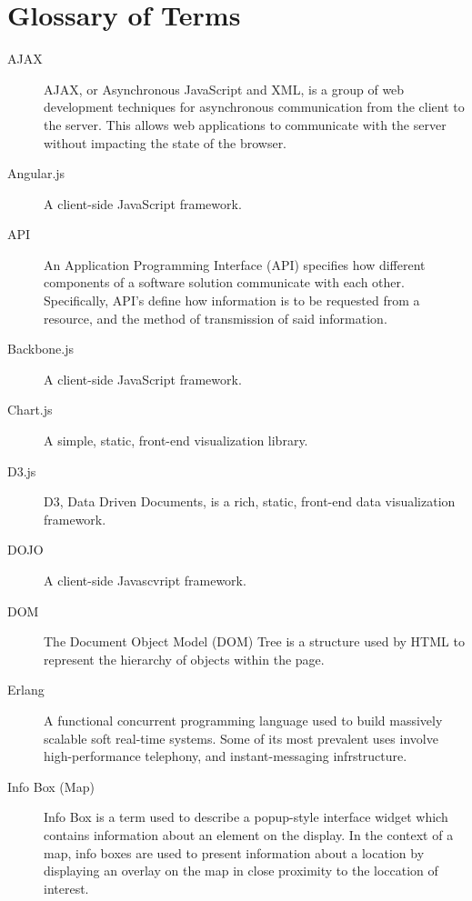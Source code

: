 \documentclass{report}
\begin{document}


\dotableofcontents

\newpage

\chapter*{Glossary of Terms}
\begin{description}
\item[AJAX] AJAX, or Asynchronous JavaScript and XML, is a group of web development techniques for asynchronous communication from the client to the server. This allows web applications to communicate with the server without impacting the state of the browser.
\item[Angular.js] A client-side JavaScript framework.
\item[API] An Application Programming Interface (API) specifies how different components of a software solution communicate with each other. Specifically, API's define how information is to be requested from a resource, and the method of transmission of said information.
\item[Backbone.js] A client-side JavaScript framework.
\item[Chart.js] A simple, static, front-end visualization library.
\item[D3.js] D3, Data Driven Documents, is a rich, static, front-end data visualization framework.
\item[DOJO] A client-side Javascvript framework.
\item[DOM] The Document Object Model (DOM) Tree is a structure used by HTML to represent the hierarchy of objects within the page.
\item[Erlang] A functional concurrent programming language used to build massively scalable soft real-time systems. Some of its most prevalent uses involve high-performance telephony, and instant-messaging infrstructure.
\item[Info Box (Map)] Info Box is a term used to describe a popup-style interface widget which contains information about an element on the display. In the context of a map, info boxes are used to present information about a location by displaying an overlay on the map in close proximity to the loccation of interest.

\end{description}
\end{document}
